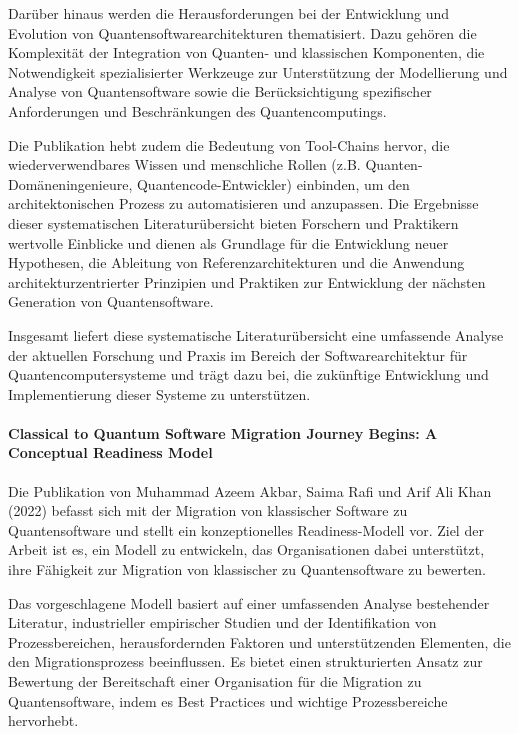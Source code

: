 Darüber hinaus werden die Herausforderungen bei der Entwicklung und Evolution von Quantensoftwarearchitekturen thematisiert. 
Dazu gehören die Komplexität der Integration von Quanten- und klassischen Komponenten, die Notwendigkeit spezialisierter 
Werkzeuge zur Unterstützung der Modellierung und Analyse von Quantensoftware sowie die Berücksichtigung spezifischer 
Anforderungen und Beschränkungen des Quantencomputings.

Die Publikation hebt zudem die Bedeutung von Tool-Chains hervor, die wiederverwendbares Wissen und menschliche 
Rollen (z.B. Quanten-Domäneningenieure, Quantencode-Entwickler) einbinden, um den architektonischen Prozess zu 
automatisieren und anzupassen. Die Ergebnisse dieser systematischen Literaturübersicht bieten Forschern und Praktikern 
wertvolle Einblicke und dienen als Grundlage für die Entwicklung neuer Hypothesen, die Ableitung von 
Referenzarchitekturen und die Anwendung architekturzentrierter Prinzipien und Praktiken zur Entwicklung der nächsten Generation von Quantensoftware.

Insgesamt liefert diese systematische Literaturübersicht eine umfassende Analyse der aktuellen Forschung und 
Praxis im Bereich der Softwarearchitektur für Quantencomputersysteme und trägt dazu bei, die zukünftige Entwicklung 
und Implementierung dieser Systeme zu unterstützen.

\paragraph{Classical to Quantum Software Migration Journey Begins: A Conceptual Readiness Model}

Die Publikation von Muhammad Azeem Akbar, Saima Rafi und Arif Ali Khan (2022) \cite{Akbar_2022} befasst sich mit der Migration von klassischer 
Software zu Quantensoftware und stellt ein konzeptionelles Readiness-Modell vor. Ziel der Arbeit ist es, ein Modell 
zu entwickeln, das Organisationen dabei unterstützt, ihre Fähigkeit zur Migration von klassischer zu Quantensoftware zu bewerten.

Das vorgeschlagene Modell basiert auf einer umfassenden Analyse bestehender Literatur, industrieller empirischer 
Studien und der Identifikation von Prozessbereichen, herausfordernden Faktoren und unterstützenden Elementen, die 
den Migrationsprozess beeinflussen. Es bietet einen strukturierten Ansatz zur Bewertung der Bereitschaft einer 
Organisation für die Migration zu Quantensoftware, indem es Best Practices und wichtige Prozessbereiche hervorhebt.

